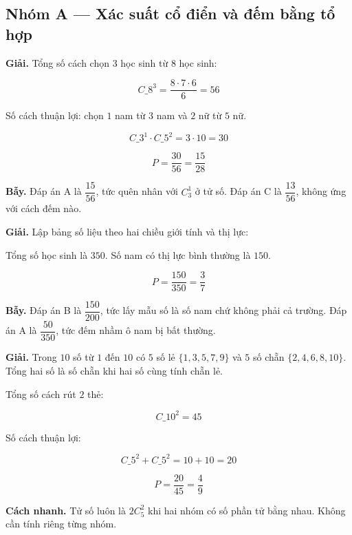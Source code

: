 \documentclass[11pt, a4paper]{article}
\begin{document}

\subsection*{Nhóm A — Xác suất cổ điển và đếm bằng tổ hợp}

\begin{dapan}[1 — Đáp án D]
\textbf{Giải.} Tổng số cách chọn $3$ học sinh từ $8$ học sinh:

$$C\_8^3 = \frac{8 \cdot 7 \cdot 6}{6} = 56$$

Số cách thuận lợi: chọn $1$ nam từ $3$ nam và $2$ nữ từ $5$ nữ.

$$C\_3^1 \cdot C\_5^2 = 3 \cdot 10 = 30$$

$$P = \frac{30}{56} = \frac{15}{28}$$

\textbf{Bẫy.} Đáp án A là $\dfrac{15}{56}$, tức quên nhân với $C_3^1$ ở tử số. Đáp án C là $\dfrac{13}{56}$, không ứng với cách đếm nào.
\end{dapan}

\begin{dapan}[2 — Đáp án D]
\textbf{Giải.} Lập bảng số liệu theo hai chiều giới tính và thị lực:


Tổng số học sinh là $350$. Số nam có thị lực bình thường là $150$.

$$P = \frac{150}{350} = \frac{3}{7}$$

\textbf{Bẫy.} Đáp án B là $\dfrac{150}{200}$, tức lấy mẫu số là số nam chứ không phải cả trường. Đáp án A là $\dfrac{50}{350}$, tức đếm nhầm ô nam bị bất thường.
\end{dapan}

\begin{dapan}[3 — Đáp án B]
\textbf{Giải.} Trong $10$ số từ $1$ đến $10$ có $5$ số lẻ $\{1,3,5,7,9\}$ và $5$ số chẵn $\{2,4,6,8,10\}$. Tổng hai số là số chẵn khi hai số cùng tính chẵn lẻ.

Tổng số cách rút $2$ thẻ:

$$C\_{10}^2 = 45$$

Số cách thuận lợi:

$$C\_5^2 + C\_5^2 = 10 + 10 = 20$$

$$P = \frac{20}{45} = \frac{4}{9}$$

\textbf{Cách nhanh.} Tử số luôn là $2 C_5^2$ khi hai nhóm có số phần tử bằng nhau. Không cần tính riêng từng nhóm.
\end{dapan}
\end{document}
